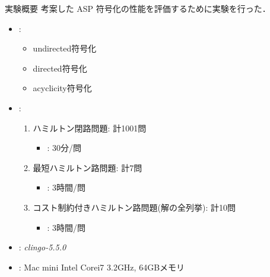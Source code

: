 \documentclass[dvipdfmx,10pt]{beamer}
\begin{document}
\begin{frame}{実験概要}
  考案した ASP 符号化の性能を評価するために実験を行った．
  \begin{itemize}
  \item {}:
    \begin{itemize}
    \item \textsf{undirected}符号化
    \item \textsf{directed}符号化
    \item \textsf{acyclicity}符号化
    \end{itemize}
  \item {}:
    \begin{enumerate}
    \item ハミルトン閉路問題: 計1001問
      \begin{itemize}
      \item {}: 30分/問
      \end{itemize}
    \item 最短ハミルトン路問題: 計7問
      \begin{itemize}
      \item {}: 3時間/問
      \end{itemize}
    \item コスト制約付きハミルトン路問題(解の全列挙): 計10問
      \begin{itemize}
      \item {}: 3時間/問
      \end{itemize}
    \end{enumerate}
  \item {}: \textit{clingo-5.5.0}
  \item {}: Mac mini Intel Corei7 3.2GHz, 64GBメモリ
  \end{itemize}
\end{frame}
\end{document}
